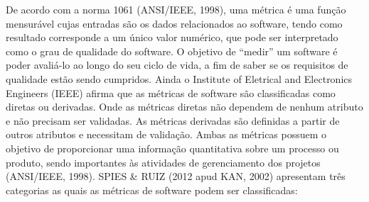 De acordo com a norma 1061 (ANSI/IEEE, 1998), uma métrica é uma função mensurável cujas entradas são os dados relacionados ao software, tendo como resultado corresponde a um único valor numérico, que pode ser interpretado como o grau de qualidade do software. O objetivo de “medir” um software é poder avaliá-lo ao longo do seu ciclo de vida, a fim de saber se os requisitos de qualidade estão sendo cumpridos.
Ainda o Institute of Eletrical and Electronics Engineers (IEEE) afirma que as métricas de software são classificadas como diretas ou derivadas. Onde as métricas diretas não dependem de nenhum atributo e não precisam ser validadas. As métricas derivadas são definidas a partir de outros atributos e necessitam de validação. Ambas as métricas possuem o objetivo de proporcionar uma informação quantitativa sobre um processo ou produto, sendo importantes às atividades de gerenciamento dos projetos (ANSI/IEEE, 1998).
SPIES & RUIZ (2012 apud KAN, 2002) apresentam três categorias as quais as métricas de software podem ser classificadas:
